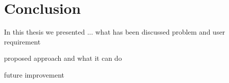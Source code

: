 \chapter{Conclusion}

In this thesis we presented ...
what has been discussed
  problem and user requirement
  
proposed approach and what it can do

future improvement

